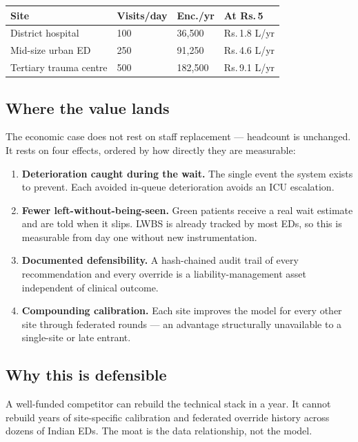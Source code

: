 \documentclass[10pt,a4paper,twocolumn]{article}
\begin{document}
\begin{center}\footnotesize\sffamily
\begin{tabular}{@{}p{2.35cm}p{1.35cm}p{1.85cm}p{1.4cm}@{}}
\toprule
\rowcolor{AccPurple!10}
\textbf{Site} & \textbf{Visits/day} & \textbf{Enc./yr} & \textbf{At Rs.\,5}\\
\midrule
District hospital & 100 & 36{,}500 & Rs.\,1.8 L/yr\\
Mid-size urban ED & 250 & 91{,}250 & Rs.\,4.6 L/yr\\
Tertiary trauma centre & 500 & 182{,}500 & Rs.\,9.1 L/yr\\
\bottomrule
\end{tabular}
\end{center}

\subsection{Where the value lands}
The economic case does not rest on staff replacement --- headcount is unchanged. It rests on four
effects, ordered by how directly they are measurable:

\begin{enumerate}
  \item \textbf{Deterioration caught during the wait.} The single event the system exists to
        prevent. Each avoided in-queue deterioration avoids an ICU escalation.
  \item \textbf{Fewer left-without-being-seen.} Green patients receive a real wait estimate and are
        told when it slips. LWBS is already tracked by most EDs, so this is measurable from day one
        without new instrumentation.
  \item \textbf{Documented defensibility.} A hash-chained audit trail of every recommendation and
        every override is a liability-management asset independent of clinical outcome.
  \item \textbf{Compounding calibration.} Each site improves the model for every other site through
        federated rounds --- an advantage structurally unavailable to a single-site or late entrant.
\end{enumerate}

\subsection{Why this is defensible}
A well-funded competitor can rebuild the technical stack in a year. It cannot rebuild years of
site-specific calibration and federated override history across dozens of Indian EDs. The moat is
the data relationship, not the model.
\end{document}
